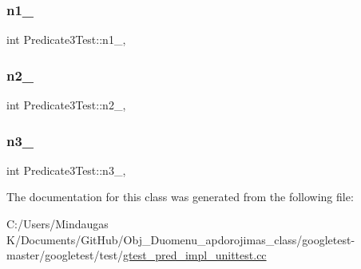 \mbox{\label{class_predicate3_test_ac232320a93f0c1e09886148a3e1929a5}} 
\subsubsection{\texorpdfstring{n1\_}{n1\_}}
{\footnotesize\ttfamily int Predicate3\+Test\+::n1\+\_\+\hspace{0.3cm}{\ttfamily [static]}, {\ttfamily [protected]}}

\mbox{\label{class_predicate3_test_a11049ef16bcaadc8262faf7349c7676e}} 
\subsubsection{\texorpdfstring{n2\_}{n2\_}}
{\footnotesize\ttfamily int Predicate3\+Test\+::n2\+\_\+\hspace{0.3cm}{\ttfamily [static]}, {\ttfamily [protected]}}

\mbox{\label{class_predicate3_test_afc1df6b079ffe22b87479b161d2ad2f7}} 
\subsubsection{\texorpdfstring{n3\_}{n3\_}}
{\footnotesize\ttfamily int Predicate3\+Test\+::n3\+\_\+\hspace{0.3cm}{\ttfamily [static]}, {\ttfamily [protected]}}



The documentation for this class was generated from the following file\+:\begin{DoxyCompactItemize}
\item 
C\+:/\+Users/\+Mindaugas K/\+Documents/\+Git\+Hub/\+Obj\+\_\+\+Duomenu\+\_\+apdorojimas\+\_\+class/googletest-\/master/googletest/test/\mbox{\hyperlink{googletest-master_2googletest_2test_2gtest__pred__impl__unittest_8cc}{gtest\+\_\+pred\+\_\+impl\+\_\+unittest.\+cc}}\end{DoxyCompactItemize}
